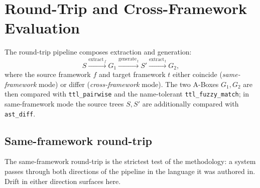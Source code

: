 \section{Round-Trip and Cross-Framework Evaluation}\label{sec:roundtrip-eval}

The round-trip pipeline composes extraction and generation:
\[
  S \xrightarrow{\text{extract}_{\,f}} G_1
    \xrightarrow{\text{generate}_{\,t}} S'
    \xrightarrow{\text{extract}_{\,t}} G_2,
\]
where the source framework $f$ and target framework $t$ either
coincide (\emph{same-framework} mode) or differ
(\emph{cross-framework} mode). The two A-Boxes $G_1, G_2$ are then
compared with \texttt{ttl\_pairwise} and the name-tolerant
\texttt{ttl\_fuzzy\_match}; in same-framework mode the source trees
$S, S'$ are additionally compared with \texttt{ast\_diff}.

\subsection{Same-framework round-trip}

The same-framework round-trip is the strictest test of the
methodology: a system passes through both directions of the pipeline
in the language it was authored in. Drift in either direction surfaces
here.


